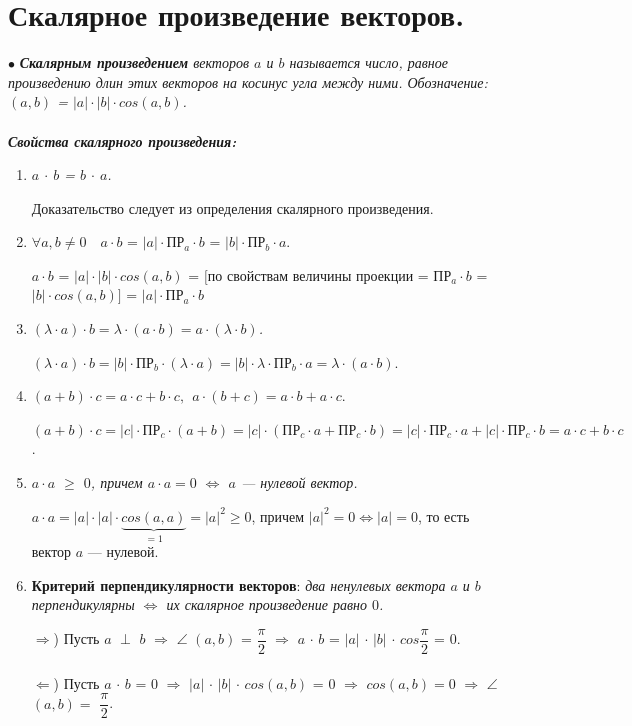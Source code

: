 \section{Скалярное произведение векторов.}
$\bullet$ \textit{\textbf{Скалярным произведением} векторов $a$ и $b$ называется число, равное произведению длин этих векторов на косинус угла между ними. Обозначение: $(a, b)$ = $|a|\cdot|b|\cdot cos(a,b)$.}\\\\
\textbf{\textit{Свойства скалярного произведения:}}\begin{enumerate}
	\item \textit{$a$ $\cdot$ $b$ = $b$ $\cdot$ $a$.}
	\begin{Proof} Доказательство следует из определения скалярного произведения.\end{Proof}
	\item $\forall a, b \ne 0\quad a\cdot b$ = $|a| \cdot\text{ПР}_a \cdot b$ = $|b| \cdot\text{ПР}_b \cdot a$.
	\begin{Proof} $a\cdot b$ = $|a| \cdot |b| \cdot cos(a,b)$ = $[$по свойствам величины проекции = ПР$_a \cdot b$ = $|b| \cdot cos(a, b)]$ = $|a| \cdot\text{ПР}_a \cdot b$ \end{Proof}
	\item \textit{$(\lambda\cdot a)\cdot b = \lambda\cdot( a\cdot b) = a\cdot(\lambda\cdot b)$.}
	\begin{Proof} $(\lambda\cdot a )\cdot b = |b| \cdot\text{ПР}_b \cdot(\lambda\cdot a) =|b|\cdot\lambda\cdot\text{ПР}_b\cdot a = \lambda\cdot(a\cdot b)$.\end{Proof}
	\item $(a+b)\cdot c = a\cdot c + b\cdot c, \ \ a\cdot (b+c) = a\cdot b + a\cdot c.$
	\begin{Proof} $(a+b)\cdot c = |c|\cdot\text{ПР}_c\cdot(a+b) = |c|\cdot(\text{ПР}_c\cdot a+\text{ПР}_c\cdot b) = |c|\cdot\text{ПР}_c\cdot a + |c|\cdot\text{ПР}_c\cdot b = a\cdot c + b\cdot c$. \end{Proof}
	\item\textit{$a\cdot a$ $\geqslant$ $0$, причем $a\cdot a = 0$ $\Longleftrightarrow$ $a$ --- нулевой вектор.}
	\begin{Proof} $a\cdot a = |a|\cdot|a|\cdot\underbrace{cos(a,a)}_{=1} = |a|^2 \geqslant 0$, причем $|a|^2 = 0 \Longleftrightarrow |a| = 0$, то есть вектор $a$ --- нулевой. \end{Proof}
	\item\textbf{Критерий перпендикулярности векторов}: \textit{два ненулевых вектора $a$ и $b$ перпендикулярны $\Longleftrightarrow$ их скалярное произведение равно $0$.}
	\begin{Proof} $\Rightarrow$) Пусть $a$ $\perp$ $b$ $\Rightarrow$ $\angle$ $(a, b)$ = $\dfrac{\pi}{2}$ $\Rightarrow$ $a$ $\cdot$ $b$ = $|a|$ $\cdot$ $|b|$ $\cdot$ $cos\dfrac{\pi}{2}$ = $0$.\\\\
		$\Leftarrow$) Пусть $a$ $\cdot$ $b$ = $0$ $\Rightarrow$ $|a|$ $\cdot$ $|b|$ $\cdot$ $cos(a,b)$ = $0$ $\Rightarrow$ $cos(a, b) = 0$ $\Rightarrow$ $\angle$ $(a,b) =$ $\dfrac{\pi}{2}$. \end{Proof}
\end{enumerate}

